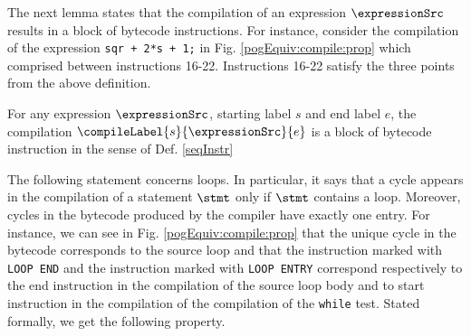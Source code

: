 The next lemma states that the compilation of an expression $\expressionSrc$ results in
 a block of bytecode instructions.  For instance, consider the compilation of the expression \lstinline!sqr + 2*s + 1;! in Fig. \ref{pogEquiv:compile:prop}  
which comprised between instructions 16-22. Instructions  16-22 satisfy the three points from the above definition.
\begin{compProp}\label{compile:prop:compProp3}
    For any expression $\expressionSrc$, starting label $s$ and end label $e$,
    the compilation $\compileLabel{s}{\expressionSrc}{e}$ is a block of bytecode instruction in the sense of Def. \ref{seqInstr}
   
\end{compProp}


The following statement concerns  loops. In particular, it says  that a cycle appears in the compilation of a statement  $\stmt$  only if $\stmt$ contains a loop.
Moreover, cycles in the bytecode produced by the compiler have exactly one entry.
For instance, we can  see in Fig. \ref{pogEquiv:compile:prop} that the unique cycle in the bytecode corresponds to the source loop and that the 
instruction marked with \lstinline!LOOP END! and the instruction marked with \lstinline!LOOP ENTRY! correspond respectively to the end instruction   in the 
compilation of the source loop body   and to start instruction in the compilation of the compilation of the \lstinline!while! test. 
Stated formally, we get the following property. 

